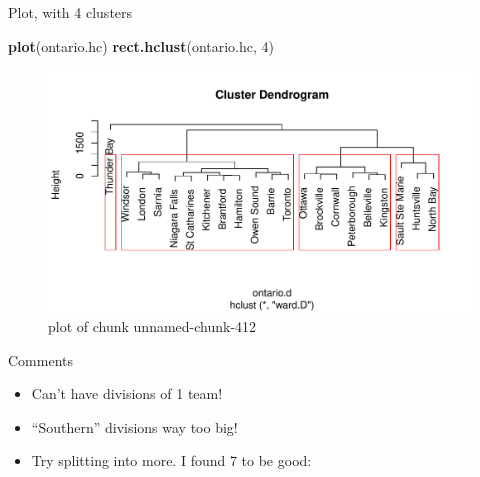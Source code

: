 \documentclass[ignorenonframetext,]{beamer}
\newenvironment{Shaded}{\begin{snugshade}}{\end{snugshade}}
\newcommand{\DecValTok}[1]{\textcolor[rgb]{0.00,0.00,0.81}{#1}}
\newcommand{\KeywordTok}[1]{\textcolor[rgb]{0.13,0.29,0.53}{\textbf{#1}}}
\newcommand{\NormalTok}[1]{#1}
\begin{document}
\begin{frame}[fragile]{Plot, with 4 clusters}
\protect\hypertarget{plot-with-4-clusters}{}

\begin{Shaded}
\begin{Highlighting}[]
\KeywordTok{plot}\NormalTok{(ontario.hc)}
\KeywordTok{rect.hclust}\NormalTok{(ontario.hc, }\DecValTok{4}\NormalTok{)}
\end{Highlighting}
\end{Shaded}

\begin{figure}
\centering
\includegraphics{figure/unnamed-chunk-412-1.pdf}
\caption{plot of chunk unnamed-chunk-412}
\end{figure}

\end{frame}

\begin{frame}{Comments}
\protect\hypertarget{comments-26}{}

\begin{itemize}
\item
  Can't have divisions of 1 team!
\item
  ``Southern'' divisions way too big!
\item
  Try splitting into more. I found 7 to be good:
\end{itemize}

\end{frame}
\end{document}
